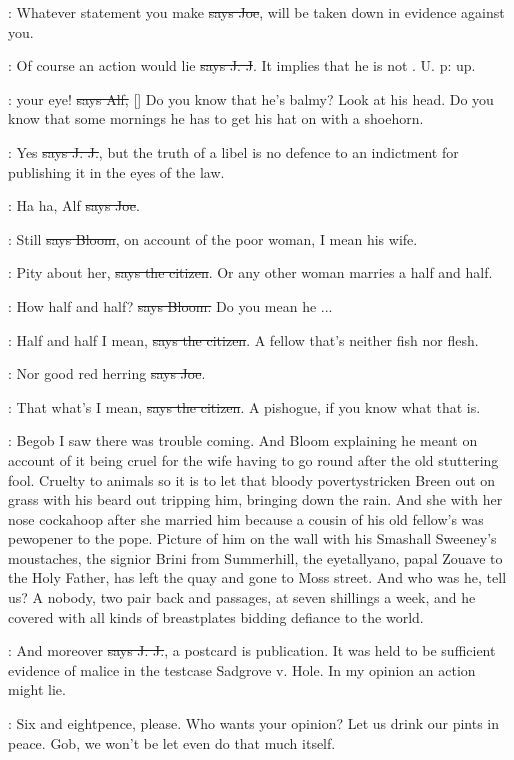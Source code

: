 \joe:
Whatever statement you make \sout{says Joe},
will be taken down in evidence
against you.

\jjom:
Of course an action would lie \sout{says J. J}.
It implies that he is not
. U. p: up.

\bergan:
 your eye!
\sout{says Alf,} []
Do you know that he's balmy?
Look at his head. Do you know that some mornings he has to get his hat on
with a shoehorn.

\jjom:
Yes \sout{says J. J.},
but the truth of a libel is no defence to an indictment
for publishing it in the eyes of the law.

\joe:
Ha ha, Alf \sout{says Joe}.

\Bloom:
Still \sout{says Bloom}, on account of the poor woman,
I mean his wife.

\citizen:
Pity about her, \sout{says the citizen}.
Or any other woman marries a half and half.

\Bloom:
How half and half? \sout{says Bloom.}
Do you mean he ...

\citizen:
Half and half I mean, \sout{says the citizen}.
A fellow that's neither fish nor flesh.

\joe:
Nor good red herring \sout{says Joe}.

\citizen:
That what's I mean, \sout{says the citizen}.
A pishogue, if you know what that is.

\Nq:
Begob I saw there was trouble coming. And Bloom explaining he meant on
account of it being cruel for the wife having to go round after the
old stuttering fool. Cruelty to animals so it is to let that bloody
povertystricken Breen out on grass with his beard out tripping him,
bringing down the rain. And she with her nose cockahoop after she married
him because a cousin of his old fellow's was pewopener to the pope.
Picture of him on the wall with his Smashall Sweeney's moustaches, the
signior Brini from Summerhill, the eyetallyano, papal Zouave to the Holy
Father, has left the quay and gone to Moss street. And who was he, tell
us? A nobody, two pair back and passages, at seven shillings a week, and
he covered with all kinds of breastplates bidding defiance to the world.

\jjom:
And moreover \sout{says J. J.},
a postcard is publication. It was held to be
sufficient evidence of malice in the testcase Sadgrove v. Hole. In my
opinion an action might lie.

\Nq:
Six and eightpence, please. Who wants your opinion? Let us drink
our pints in peace. Gob, we won't be let even do that much itself.

